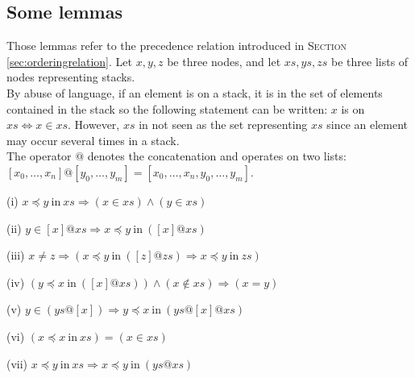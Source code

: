 \documentclass[a4 paper, 12pt]{article}
\theoremstyle{definition}
\begin{document}
{\subsection{Some lemmas}
Those lemmas refer to the precedence relation introduced in \textsc{Section} \ref{sec:orderingrelation}.
\BlankLine
Let $x, y, z$ be three nodes, and let $xs, ys, zs$ be three lists of nodes representing stacks.\\
By abuse of language, if an element is on a stack, it is in the set of elements contained in the stack so the following statement can be written: $x$ is on $xs \Longleftrightarrow x \in xs$. However, $xs$ in not seen as the set representing $xs$ since an element may occur several times in a stack.\\
The operator $@$ denotes the concatenation and operates on two lists: $[x_0, \dots, x_n] @ [y_0, \dots, y_m] = [x_0, \dots, x_n, y_0, \dots, y_m]$.\\

\begin{flushleft}
    (i)
$x \preceq y~\text{in}~xs \Longrightarrow (x \in xs)\wedge(y \in xs)$
\end{flushleft}
\begin{flushleft}
    (ii)
$y \in [x] @ xs \Longrightarrow x \preceq y~\text{in}~([x] @ xs)$
\end{flushleft}

\begin{flushleft}
    (iii)
    $x \neq z \Longrightarrow (x \preceq y~\text{in}~([z] @ zs) \Longrightarrow x \preceq y ~\text{in}~zs)$
\end{flushleft}

\begin{flushleft}
    (iv)
    $(y \preceq x~\text{in}~([x] @ xs)) \wedge (x \notin xs) \Longrightarrow (x = y)$
\end{flushleft}

\begin{flushleft}
    (v)
    $y \in (ys @ [x]) \Longrightarrow y \preceq x~\text{in}~(ys @ [x] @ xs)$
\end{flushleft} 

\begin{flushleft}
    (vi)
    $(x \preceq x~\text{in}~xs) = (x \in xs)$
\end{flushleft}

\begin{flushleft}
    (vii)
    $x \preceq y~\text{in}~xs \Longrightarrow x \preceq y~\text{in}~(ys @ xs)$
\end{flushleft}

}
\end{document}
